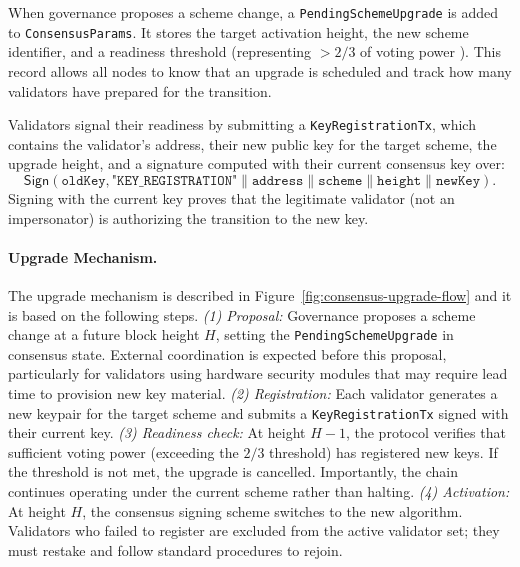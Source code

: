 When governance proposes a scheme change, a \texttt{PendingSchemeUpgrade} is added to \texttt{ConsensusParams}.
It stores the target activation height, the new scheme identifier, and a readiness threshold (representing $>2/3$ of voting power \cite{ARXIV:BKM18}). %
This record allows all nodes to know that an upgrade is scheduled and track how many validators have prepared for the transition.

Validators signal their readiness by submitting a \texttt{KeyRegistrationTx}, which contains the validator's address, their new public key for the target scheme, the upgrade height, and a signature computed with their current consensus key over:
\begin{equation*}
\mathsf{Sign}\left(\texttt{oldKey}, \texttt{"KEY\_REGISTRATION"} \parallel \texttt{address} \parallel \texttt{scheme} \parallel \texttt{height} \parallel \texttt{newKey}\right).
\end{equation*}
Signing with the current key proves that the legitimate validator (not an impersonator) is authorizing the transition to the new key.

\paragraph{Upgrade Mechanism.}\label{para:upgrade-flow} The upgrade mechanism is described in Figure~\ref{fig:consensus-upgrade-flow} and it is based on the following steps.
\emph{(1) Proposal:} Governance proposes a scheme change at a future block height $H$, setting the \texttt{PendingSchemeUpgrade} in consensus state.
External coordination is expected before this proposal, particularly for validators using hardware security modules that may require lead time to provision new key material.
\emph{(2) Registration:} Each validator generates a new keypair for the target scheme and submits a \texttt{KeyRegistrationTx} signed with their current key.
\emph{(3) Readiness check:} At height $H-1$, the protocol verifies that sufficient voting power (exceeding the $2/3$ threshold) has registered new keys.
If the threshold is not met, the upgrade is cancelled. Importantly, the chain continues operating under the current scheme rather than halting.
\emph{(4) Activation:} At height $H$, the consensus signing scheme switches to the new algorithm.
Validators who failed to register are excluded from the active validator set; they must restake and follow standard procedures to rejoin.

